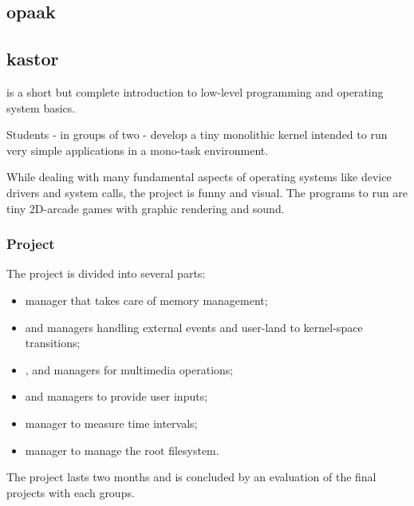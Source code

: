 \begin{multicols}{2}
%
%

\section{opaak}

%
%

\subsection{kastor}

 is a short but complete introduction to low-level programming and
operating system basics.

Students - in groups of two - develop a tiny monolithic kernel
intended to run very simple applications in a mono-task environment.

While dealing with many fundamental aspects of operating systems like
device drivers and system calls, the project is funny and visual. The
programs to run are tiny 2D-arcade games with graphic rendering and
sound.


\subsubsection{Project}

The project is divided into several parts:

\begin{itemize}
  \item
     manager that takes care of memory management;
  \item
     and  managers handling external
    events and user-land to kernel-space transitions;
  \item
    ,  and  managers for
    multimedia operations;
  \item
     and  managers to provide user inputs;
  \item
     manager to measure time intervals;
  \item
     manager to manage the root filesystem.
\end{itemize}

The project lasts two months and is concluded by an evaluation of the
final projects with each groups.



\end{multicols}
